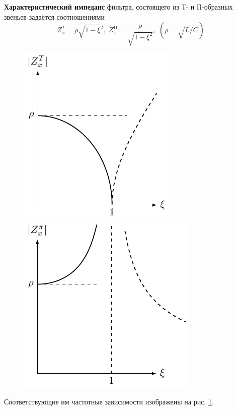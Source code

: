 \textbf{Характеристический импеданс} фильтра, состоящего из Т- и П-образных звеньев задаётся соотношениями
\begin{equation}
	Z^T_x=\rho\sqrt{1-\xi^2},\;
	Z^{\text{П}}_x=\frac{\rho}{\sqrt{1-\xi^2}},\;
	(\rho=\sqrt{L/C})
\end{equation}
\begin{figure}[h!]
\begin{minipage}{0.49\linewidth}
	\centering
	\includegraphics[]{chem/FLF/ZxT.pdf}
\end{minipage}
\begin{minipage}{0.49\linewidth}
	\centering
	\includegraphics[]{chem/FLF/ZxP.pdf}
\end{minipage}
\caption{}
\label{fig:1.3}
\end{figure}
Соответствующие им частотные зависимости изображены на рис. \ref{fig:1.3}.

